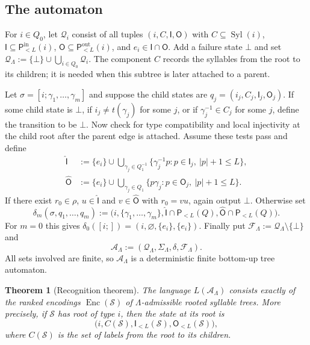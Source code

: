 \documentclass[11pt,a4paper]{amsart}
\newcommand{\Syl}{\operatorname{Syl}}
\newcommand{\Enc}{\operatorname{Enc}}
\theoremstyle{definition}
\theoremstyle{plain}
\newtheorem{theorem}[definition]{Theorem}
\theoremstyle{remark}
\numberwithin{equation}{section}
\begin{document}
\subsection{The automaton}
\label{subsec:the automaton}
For $i\in Q_0$, let $\mathcal Q_i$ consist of all tuples $(i,C,\mathsf I,\mathsf O)$ with $C\subseteq\Syl(i)$, $\mathsf I\subseteq\mathsf P^{\mathrm{in}}_{<L}(i)$, $\mathsf O\subseteq\mathsf P^{\mathrm{out}}_{<L}(i)$, and $e_i\in\mathsf I\cap\mathsf O$. Add a failure state $\bot$ and set $\mathcal Q_\Lambda:=\{\bot\}\cup\bigcup_{i\in Q_0}\mathcal Q_i$. The component $C$ records the syllables from the root to its children; it is needed when this subtree is later attached to a parent.

Let $\sigma=[i;\gamma_1,\ldots,\gamma_m]$ and suppose the child states are $q_j=(i_j,C_j,\mathsf I_j,\mathsf O_j)$. If some child state is $\bot$, if $i_j\neq t(\gamma_j)$ for some $j$, or if $\gamma_j^{-1}\in C_j$ for some $j$, define the transition to be $\bot$. Now check for type compatibility and local injectivity at the child root after the parent edge is attached. Assume these tests pass and define
\begin{align*}
\widehat{\mathsf I}&:=\{e_i\}\cup\bigcup_{\gamma_j\in Q_1^{-1}}\{\gamma_j^{-1}p:p\in\mathsf I_j,\ |p|+1\leq L\},\\
\widehat{\mathsf O}&:=\{e_i\}\cup\bigcup_{\gamma_j\in Q_1}\{p\gamma_j:p\in\mathsf O_j,\ |p|+1\leq L\}.
\end{align*}
If there exist $r_0\in\rho$, $u\in\widehat{\mathsf I}$ and $v\in\widehat{\mathsf O}$ with $r_0=vu$, again output $\bot$. Otherwise set
\[
\delta_m(\sigma,q_1,\ldots,q_m):=\bigl(i,\{\gamma_1,\ldots,\gamma_m\},\widehat{\mathsf I}\cap\mathsf P_{<L}(Q),\widehat{\mathsf O}\cap\mathsf P_{<L}(Q)\bigr).
\]
For $m=0$ this gives $\delta_0([i;])=(i,\varnothing,\{e_i\},\{e_i\})$. Finally put $\mathcal F_\Lambda:=\mathcal Q_\Lambda\setminus\{\bot\}$ and
\[
\mathcal A_\Lambda:=(\mathcal Q_\Lambda,\Sigma_\Lambda,\delta,\mathcal F_\Lambda).
\]
All sets involved are finite, so $\mathcal A_\Lambda$ is a deterministic finite bottom-up tree automaton.

\begin{theorem}[Recognition theorem]\label{thm:recognition}
The language $L(\mathcal A_\Lambda)$ consists exactly of the ranked encodings $\Enc(\mathcal S)$ of $\Lambda$-admissible rooted syllable trees. More precisely, if $\mathcal S$ has root of type $i$, then the state at its root is
\[
\bigl(i,C(\mathcal S),\mathsf I_{<L}(\mathcal S),\mathsf O_{<L}(\mathcal S)\bigr),
\]
where $C(\mathcal S)$ is the set of labels from the root to its children.
\end{theorem}
\end{document}
